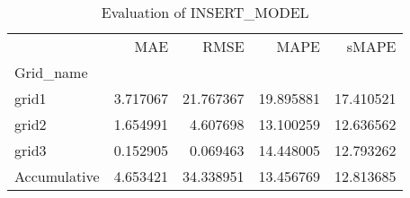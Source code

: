 \begin{table}
\centering
\caption{Evaluation of INSERT_MODEL}
\begin{tabular}{lrrrr}
\toprule
{} &       MAE &       RMSE &       MAPE &      sMAPE \\
Grid\_name    &           &            &            &            \\
\midrule
grid1        &  3.717067 &  21.767367 &  19.895881 &  17.410521 \\
grid2        &  1.654991 &   4.607698 &  13.100259 &  12.636562 \\
grid3        &  0.152905 &   0.069463 &  14.448005 &  12.793262 \\
Accumulative &  4.653421 &  34.338951 &  13.456769 &  12.813685 \\
\bottomrule
\end{tabular}
\end{table}
